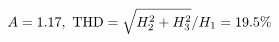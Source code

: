 \documentclass[preview]{standalone}
\begin{document}
\begin{align*}
\special{dvisvgm:raw <g id='unique000'>}A=1.17,\ \text{THD}=\sqrt{H_2^2+H_3^2}/H_1=19.5\%\special{dvisvgm:raw </g>}
\end{align*}
\end{document}
